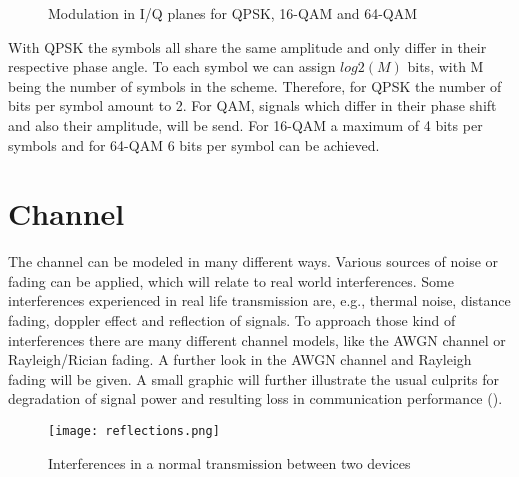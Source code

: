\begin{figure}[!htb]
	\setlength{}
	\setlength\fheight{0.3\textheight}
\begin{subfigure}

		
\end{subfigure}
\begin{subfigure}
	
	
\end{subfigure}
\begin{subfigure}

	
\end{subfigure}	
	\caption{Modulation in I/Q planes for QPSK, 16-QAM and 64-QAM}
	\label{fig:Modulation}
\end{figure}

With \gls{QPSK} the symbols all share the same amplitude and only differ in their respective phase angle. To each symbol we can assign $log2(M)$ bits, with M being the number of symbols in the scheme. Therefore, for \gls{QPSK} the number of bits per symbol amount to 2.
\newline
For \gls{QAM}, signals which differ in their phase shift and also their amplitude, will be send. For 16-\gls{QAM} a maximum of 4 bits per symbols and for 64-\gls{QAM} 6 bits per symbol can be achieved. 

\section{Channel}
\label{sec:channel} 

The channel can be modeled in many different ways. Various sources of noise or fading can be applied, which will relate to real world interferences. Some interferences experienced in real life transmission are, e.g., thermal noise, distance fading, doppler effect and reflection of signals. To approach those kind of interferences there are many different channel models, like the \gls{AWGN} channel or Rayleigh/Rician fading. A further look in the \gls{AWGN} channel and Rayleigh fading will be given. A small graphic will further illustrate the usual culprits for degradation of signal power and resulting loss in communication performance ().
\begin{figure}[!htb]
	\centering
	\texttt{[image: reflections.png]}
	\caption{Interferences in a normal transmission between two devices}
	\label{fig:interferences}
\end{figure}
\newpage

